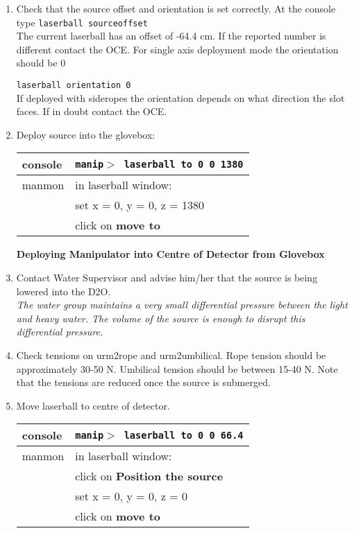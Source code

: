 \begin{enumerate}
 \item\checkbox Check that the source offset and orientation is set correctly.
   At the console type 
 {\tt laserball sourceoffset } \\
  The current laserball has an offset of -64.4 cm. If the reported number is
different contact the OCE. For single axis deployment mode the orientation should
be 0

  {\tt laserball orientation 0 } \\
 If deployed with sideropes the orientation depends on what direction the slot
faces. If in doubt contact the OCE. 

 \item\checkbox Deploy source into the glovebox:
  \begin{center}
  \begin{tabular}{|l|l|}
  \hline
  console & {\tt manip$>$ laserball to 0 0 1380} \\
  \hline
  manmon  & in laserball window: \\
          & set x = 0, y = 0, z = 1380\\
          & click on {\bf move to} \\
  \hline
  \end{tabular}
  \end{center}



\begin{center}
  {\bf Deploying Manipulator into Centre of 
            Detector from Glovebox}
\end{center}
 
 \item\checkbox Contact Water Supervisor and advise him/her that the source is
   being lowered into the D2O.  \\
   \small
   {\em
     The water group maintains a very small differential pressure
     between the light and heavy water.  The volume of the source
     is enough to disrupt this differential pressure.
   }
   \normalsize

 \item\checkbox Check tensions on urm2rope and urm2umbilical.  Rope tension
   should be approximately 30-50 N.  Umbilical tension should
   be between 15-40 N. Note that the tensions are reduced once the
source is submerged.
  
 \item\checkbox Move laserball to centre of detector.
  \begin{center}
  \begin{tabular}{|l|l|}
  \hline
  console & {\tt manip$>$ laserball to 0 0 66.4} \\
  \hline
  manmon  & in laserball window: \\
          & click on {\bf Position the source}\\
          & set x = 0, y = 0, z = 0\\
          & click on {\bf move to} \\
  \hline
  \end{tabular}
  \end{center}


\end{enumerate}
